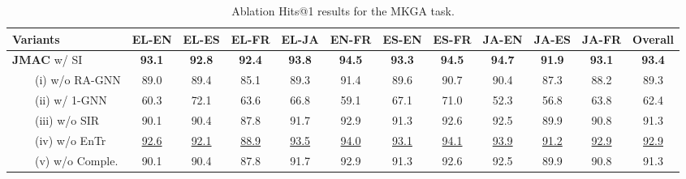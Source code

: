 \documentclass[11pt]{article}
\begin{document}
\begin{table*}[!t]
    \begin{adjustbox}{width=440pt,center}
    \centering
    \setlength{\tabcolsep}{0.3em}
    \begin{tabular}{l|c|c|c|c|c|c|c|c|c|c|c}
    \hline
    \textbf{Variants} & \textbf{EL-EN} & \textbf{EL-ES} & \textbf{EL-FR} & \textbf{EL-JA} & \textbf{EN-FR} & \textbf{ES-EN} & \textbf{ES-FR} & \textbf{JA-EN} & \textbf{JA-ES} &  \textbf{JA-FR} & \textbf{Overall} \\
\hline
    \textbf{JMAC} w/ SI  & \textbf{93.1} & \textbf{92.8} & \textbf{92.4} & \textbf{93.8} & \textbf{94.5} & \textbf{93.3} & \textbf{94.5} & \textbf{94.7} & \textbf{91.9} & \textbf{93.1} & \textbf{93.4} \\
    \hline
    \ \ \ \ (i) w/o RA-GNN & 89.0 & 89.4 & 85.1 & 89.3 & 91.4 & 89.6 & 90.7 & 90.4 & 87.3 & 88.2 & 89.3 \\
    \ \ \ \ (ii) w/ 1-GNN & 60.3 & 72.1 & 63.6 & 66.8 & 59.1 & 67.1 & 71.0 & 52.3 & 56.8 & 63.8 & 62.4 \\
    \ \ \ \ (iii) w/o SIR & 90.1 & 90.4 & 87.8 & 91.7 & 92.9 & 91.3 & 92.6 & 92.5 & 89.9 & 90.8 & 91.3 \\
    \ \ \ \ (iv) w/o EnTr & \underline{92.6} & \underline{92.1} & \underline{88.9} & \underline{93.5} & \underline{94.0} & \underline{93.1} &  \underline{94.1} & \underline{93.9} & \underline{91.2} & \underline{92.9} & \underline{92.9} \\
    \ \ \ \ (v) w/o Comple. & 90.1 & 90.4 & 87.8 & 91.7 & 92.9 & 91.3 & 92.6 & 92.5 & 89.9 & 90.8 & 91.3 \\
    \hline
    \end{tabular}
    \end{adjustbox}
    \caption{Ablation Hits@1 results for the MKGA task.}
    \label{tab:ablation_kga_old}
\end{table*}
\end{document}
